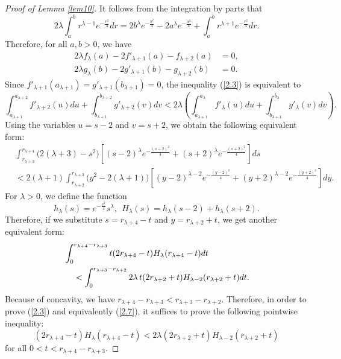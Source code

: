 \documentclass{amsart}
\theoremstyle{Corollary}
\numberwithin{equation}{section}
\begin{document}
\begin{proof}[Proof of Lemma \ref{lem10}]
It follows from the integration by parts that
\begin{equation*}
2\lambda\int_a^b r^{\lambda-1} e^{-\frac{r^2}{4}}dr
=2b^{\lambda}e^{-\frac{b^2}{4}}-2a^{\lambda}e^{-\frac{a^2}{4}}
+\int_a^b r^{\lambda+1} e^{-\frac{r^2}{4}}dr.
\end{equation*}
Therefore, for all $a, b>0$, we have
\begin{equation}\label{2.5}
\begin{split}
2\lambda f_\lambda(a)-2f'_{\lambda+1}(a)-f_{\lambda+2}(a)&=0,\\
2\lambda g_\lambda(b)-2g'_{\lambda+1}(b)-g_{\lambda+2}(b)&=0.
\end{split}
\end{equation}
Since $f'_{\lambda+1}(a_{\lambda+1})=g'_{\lambda+1}(b_{\lambda+1})=0$,
the inequality (\ref{2.3})
is equivalent to
\begin{equation}\label{2.6}
\int_{a_{\lambda+1}}^{a_{\lambda+2}}
f'_{\lambda+2}(u)du+\int_{b_{\lambda+1}}^{b_{\lambda+2}}
g'_{\lambda+2}(v)dv
<2\lambda\left(\int_{a_{\lambda+1}}^{a_{\lambda}}
f'_{\lambda}(u)du+\int_{b_{\lambda+1}}^{b_{\lambda}}
g'_{\lambda}(v)dv\right).
\end{equation}
Using the variables $u=s-2$ and $v=s+2$, we obtain the following equivalent form:
\begin{equation*}
\begin{split}
&\int_{r_{\lambda+3}}^{r_{\lambda+4}}
\big(2(\lambda+3)-s^2\big)\left[(s-2)^{\lambda}e^{-\frac{(s-2)^2}{4}}+(s+2)^{\lambda}e^{-\frac{(s+2)^2}{4}}\right]ds\\
&<2(\lambda+1) \int_{r_{\lambda+2}}^{r_{\lambda+3}}
\big(y^2-2(\lambda+1)\big)\left[(y-2)^{\lambda-2}e^{-\frac{(y-2)^2}{4}}+(y+2)^{\lambda-2}e^{-\frac{(y+2)^2}{4}}\right]dy.
\end{split}
\end{equation*}
For $\lambda>0$, we define the function
\begin{equation*}
h_\lambda(s)=e^{-\frac{s^2}{4}}s^{\lambda},~~H_\lambda(s)=h_\lambda(s-2)+h_\lambda(s+2).
\end{equation*}
Therefore, if we substitute $s=r_{\lambda+4}-t$ and $y=r_{\lambda+2}+t$, we get another equivalent form:
\begin{equation}\label{2.7}
\begin{split}
&\int_0^{r_{\lambda+4}-r_{\lambda+3}}t(2r_{\lambda+4}-t)H_\lambda(r_{\lambda+4}-t)dt\\
&\hspace{4mm}<\int_0^{r_{\lambda+3}-r_{\lambda+2}}2\lambda\, t(2r_{\lambda+2}+t)H_{\lambda-2}(r_{\lambda+2}+t)dt.
\end{split}
\end{equation}
Because of concavity, we have $r_{\lambda+4}-r_{\lambda+3}<r_{\lambda+3}-r_{\lambda+2}$.
Therefore, in order to prove (\ref{2.3})
and equivalently (\ref{2.7}),
it suffices to prove the following
pointwise inequality:
\begin{equation}\label{2.8}
(2r_{\lambda+4}-t)H_\lambda(r_{\lambda+4}-t)<2 \lambda (2r_{\lambda+2}+t)H_{\lambda-2}(r_{\lambda+2}+t)
\end{equation}
for all $0<t<r_{\lambda+4}-r_{\lambda+3}$.


\end{proof}
\end{document}
